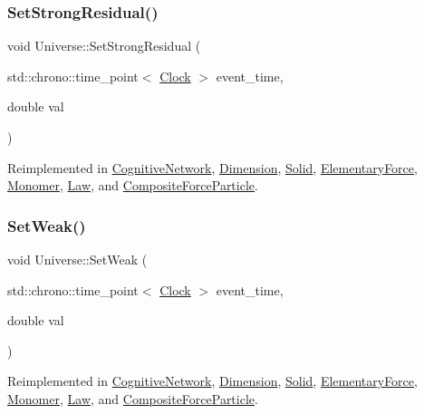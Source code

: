 \subsubsection{\texorpdfstring{Set\+Strong\+Residual()}{SetStrongResidual()}}
{\footnotesize\ttfamily void Universe\+::\+Set\+Strong\+Residual (\begin{DoxyParamCaption}\item[{std\+::chrono\+::time\+\_\+point$<$ \mbox{\hyperlink{universe_8h_a0ef8d951d1ca5ab3cfaf7ab4c7a6fd80}{Clock}} $>$}]{event\+\_\+time,  }\item[{double}]{val }\end{DoxyParamCaption})\hspace{0.3cm}{\ttfamily [virtual]}}



Reimplemented in \mbox{\hyperlink{classCognitiveNetwork_a6f7210dd8c2786518329faa61b6e14d5}{Cognitive\+Network}}, \mbox{\hyperlink{classDimension_a9bd5480b1da689cd58bf61dac7169080}{Dimension}}, \mbox{\hyperlink{classSolid_a8b80ebe209fcd3afa4791968127753d0}{Solid}}, \mbox{\hyperlink{classElementaryForce_ac25021d38c1d54bf711096ab37a461f6}{Elementary\+Force}}, \mbox{\hyperlink{classMonomer_ae6ca57913da27fa749d33d1c4fed27ca}{Monomer}}, \mbox{\hyperlink{classLaw_ad4a05c77d11ddec40b1e07246cac449d}{Law}}, and \mbox{\hyperlink{classCompositeForceParticle_aeba1070d4ec6e52fd8276e38c6a6c2e1}{Composite\+Force\+Particle}}.

\mbox{\label{classUniverse_a0f5cd04081b41ee931c0557dc397f6fb}} 
\subsubsection{\texorpdfstring{Set\+Weak()}{SetWeak()}}
{\footnotesize\ttfamily void Universe\+::\+Set\+Weak (\begin{DoxyParamCaption}\item[{std\+::chrono\+::time\+\_\+point$<$ \mbox{\hyperlink{universe_8h_a0ef8d951d1ca5ab3cfaf7ab4c7a6fd80}{Clock}} $>$}]{event\+\_\+time,  }\item[{double}]{val }\end{DoxyParamCaption})\hspace{0.3cm}{\ttfamily [virtual]}}



Reimplemented in \mbox{\hyperlink{classCognitiveNetwork_ab39c9eed50da6d3630c4498ae64b804e}{Cognitive\+Network}}, \mbox{\hyperlink{classDimension_a157cfa28dd6bc5518d622d01445ca827}{Dimension}}, \mbox{\hyperlink{classSolid_aa28e0f7e4de2fc0c1e28d385214296bf}{Solid}}, \mbox{\hyperlink{classElementaryForce_a093cdf0810e95f1d973bd9dc88c6788b}{Elementary\+Force}}, \mbox{\hyperlink{classMonomer_ad4fe1db33f493575281e1a2fb35004ca}{Monomer}}, \mbox{\hyperlink{classLaw_a1009b4e0bc0b91f41d48dc137529e97b}{Law}}, and \mbox{\hyperlink{classCompositeForceParticle_a7899a6efda98b062051e37c25c214e2a}{Composite\+Force\+Particle}}.

